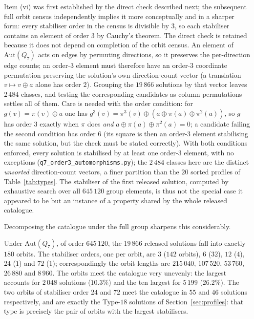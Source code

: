 \documentclass[12pt]{article}
\begin{document}
Item (vi) was first established by the direct check described next; the
subsequent full orbit census independently implies it more conceptually and in
a sharper form: every stabiliser order in the census is divisible by
$3$, so each stabiliser contains an element of order $3$ by Cauchy's
theorem. The direct check is retained because it does not depend on
completion of the orbit census. An element of
$\mathrm{Aut}(Q_7)$ acts on edges by permuting directions, so it preserves the
per-direction edge counts; an order-$3$ element must therefore have an order-$3$
coordinate permutation preserving the solution's own direction-count vector
(a translation $v\mapsto v\oplus a$ alone has order $2$). Grouping the $19\,866$
solutions by that vector leaves $2\,484$ classes, and testing the corresponding
candidates as column permutations settles all of them. Care is needed with
the order condition: for $g(v)=\pi(v)\oplus a$ one has
$g^3(v)=\pi^3(v)\oplus(a\oplus\pi(a)\oplus\pi^2(a))$, so $g$ has order $3$
exactly when $\pi$ does \emph{and} $a\oplus\pi(a)\oplus\pi^2(a)=0$; a
candidate failing the second condition has order $6$ (its square is then an
order-$3$ element stabilising the same solution, but the check must be stated
correctly). With both conditions enforced, every solution is stabilised by at
least one order-$3$ element, with no exceptions
(\texttt{q7\_order3\_automorphisms.py}); the $2\,484$ classes here are the
distinct \emph{unsorted} direction-count vectors, a finer partition than the
$20$ sorted profiles of Table~\ref{tab:types}. The stabiliser of the first
released solution, computed by exhaustive search over
all $645\,120$ group elements, is thus not the special case it appeared to be but
an instance of a property shared by the whole released catalogue.

Decomposing the catalogue under the full group sharpens this considerably.

\begin{proposition}\label{prop:orbits}
Under $\mathrm{Aut}(Q_7)$, of order $645\,120$, the $19\,866$ released
solutions fall into exactly $180$ orbits. The stabiliser orders, one per orbit,
are $3$ ($142$ orbits), $6$ ($32$), $12$ ($4$), $24$ ($1$) and $72$ ($1$);
correspondingly the orbit lengths are $215\,040$, $107\,520$, $53\,760$,
$26\,880$ and $8\,960$. The orbits meet the catalogue very unevenly: the
largest accounts for $2\,048$ solutions ($10.3\%$) and the ten largest for
$5\,199$ ($26.2\%$). The two orbits of stabiliser order $24$ and $72$ meet the
catalogue in $55$ and $46$ solutions respectively, and are exactly the
Type-$18$ solutions of Section~\ref{sec:profiles}: that type is precisely the
pair of orbits with the largest stabilisers.
\end{proposition}
\end{document}
